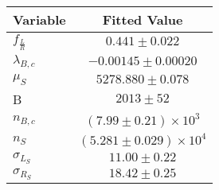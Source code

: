 \begin{tabular}[t]{lc}
\hline
Variable &Fitted Value\\
\hline\hline
$f_{\frac{L}{R}}$&$0.441\pm0.022$\\
\hline
$\lambda_{B,c}$&$-0.00145\pm0.00020$\\
\hline
$\mu_S$&$5278.880\pm0.078$\\
\hline
B&$2013\pm52$\\
\hline
$n_{B,c}$&$(7.99\pm0.21)\times 10^3$\\
\hline
$n_S$&$(5.281\pm0.029)\times 10^4$\\
\hline
$\sigma_{L_S}$&$11.00\pm0.22$\\
\hline
$\sigma_{R_S}$&$18.42\pm0.25$\\
\hline
\end{tabular}